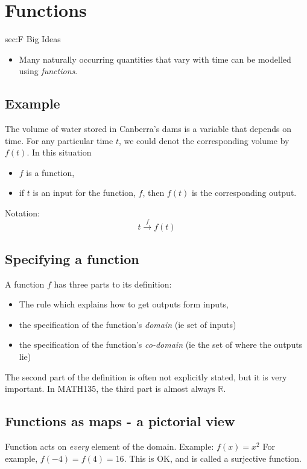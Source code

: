 \chapter{Functions}
\label{chap:F}

\begin{bigideas}{sec:F Big Ideas}
\begin{itemize}
  \item Many naturally occurring quantities that vary with time can be modelled
  using \emph{functions}.
\end{itemize}
\end{bigideas}

\section{Example}
The volume of water stored in Canberra's dams is a variable that depends on
time. For any particular time $t$, we could denot the corresponding volume by
$f(t)$. In this situation
\begin{itemize}
  \item $f$ is a function,
  \item if $t$ is an input for the function, $f$, then $f(t)$ is the
  corresponding output.
\end{itemize}
Notation:
$$t \overset{f}{\to} f(t) $$

\section{Specifying a function}
A function $f$ has three parts to its definition:
\begin{itemize}
  \item The rule which explains how to get outputs form inputs,
  \item the specification of the function's \emph{domain} (ie set of inputs)
  \item the specification of the function's \emph{co-domain} (ie the set of
  where the outputs lie)
\end{itemize}
The second part of the definition is often not explicitly stated, but it is very
important. In MATH135, the third part is almost always $\mathbb{R}$.

\section{Functions as maps - a pictorial view}
Function acts on \emph{every} element of the domain.
Example: $f(x) = x^2$
For example, $f(-4) = f(4) = 16$. This is OK, and is called a surjective
function.

